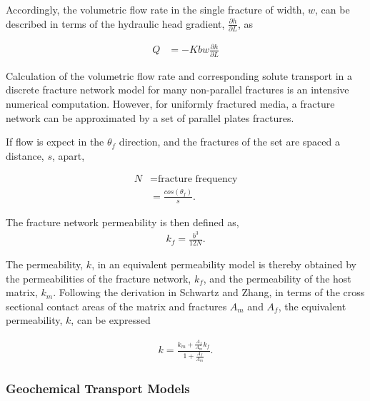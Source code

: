 Accordingly, the volumetric flow rate in the single fracture of width,
$w$, can be described in terms of the hydraulic head gradient, 
$\frac{\partial h}{\partial L}$, as

\begin{align}
  Q & = -Kbw\frac{\partial h}{\partial L}
  \label{Qplates}
\end{align}

Calculation of the volumetric flow rate and corresponding solute
transport in a discrete fracture network model for many non-parallel
fractures is an intensive numerical computation. However, for 
uniformly
fractured media, a fracture network can be approximated by a set of 
parallel plates fractures. 

If flow is expect in the $\theta_f$ direction, and the fractures of 
the set are spaced a distance, $s$, apart,

\begin{align}
  N &= \mbox{fracture frequency}\nonumber\\
  &= \frac{cos(\theta_f)}{s}.
  \label{fracfreq}
\end{align}

The fracture network permeability is then defined as,
\begin{align}
  k_f = \frac{b^3}{12N}.
  \label{fracperm}
\end{align}

The permeability, $k$, in an equivalent permeability model is thereby 
obtained
by the permeabilities of the fracture network, $k_f$, and the 
permeability
of the host matrix, $k_m$. Following the derivation in Schwartz and 
Zhang, in terms of the cross sectional contact areas of the matrix and 
fractures $A_m$ and $A_f$, the equivalent permeability, $k$, can be 
expressed

\begin{align}
  k = \frac{k_m + \frac{A_f}{A_m}k_f}{1+\frac{A_f}{A_m}}.
  \label{equivperm}
\end{align}

\subsubsection{Geochemical Transport Models}



